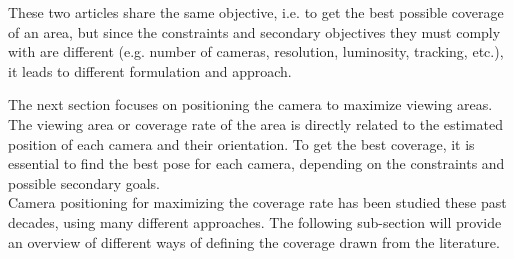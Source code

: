 
These two articles share the same objective, i.e. to get the best possible coverage of an area, but since the constraints and secondary objectives they must comply with are different (e.g. number of cameras, resolution, luminosity, tracking, etc.), it leads to different formulation and approach. 

The next section focuses on positioning the camera to maximize viewing areas. The viewing area or coverage rate of the area is directly related to the estimated position of each camera and their orientation. To get the best coverage, it is essential to find the best pose for each camera, depending on the constraints and possible secondary goals.\\

Camera positioning for maximizing the coverage rate has been studied these past decades, using many different approaches. The following sub-section will provide an overview of different ways of defining the coverage drawn from the literature.


